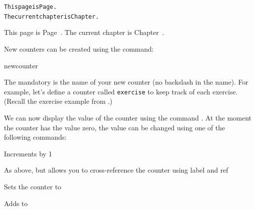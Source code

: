 \begin{code}
\begin{alltt}
This page is Page.
The current chapter is Chapter.
\end{alltt}
\end{code}\label{example:thepage}%
\begin{resultS}
This page is Page~\pageref*{example:thepage}.
The current chapter is Chapter~\thechapter.
\end{resultS}%
New counters can be created using the command:
\begin{definition}
\gls{newcounter}
\end{definition}%
The \gls{mandatory} 
is the name of your new counter (no backslash in the name).  For
example, let's define a counter called \texttt{exercise} to keep
track of each exercise. (Recall the exercise example from
.)
\begin{codeS}
\end{codeS}%
We can now display the value of the counter using
the command .  At the moment the counter
has the value zero, the value can be changed using one
of the following commands:

\begin{fwlist}{}
 Increments 
 by 1

 As above, but 
allows you to cross-\reportlinebreak reference the counter using \gls{label} and 
\gls{ref}

Sets the counter to 

Adds  to 
\end{fwlist}


